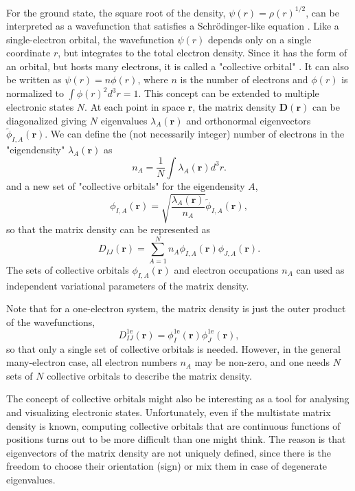 \documentclass[12pt]{article}
\newcommand\m[1]{\mathbf{#1}}
\renewcommand\vec[1]{\mathbf{#1}}
\begin{document}
For the ground state, the square root of the density, $\psi(r) = \rho(r)^{1/2}$, can be interpreted
as a wavefunction that satisfies a Schr\"{o}dinger-like equation \cite{Levy1988exact}.
Like a single-electron orbital, the wavefunction $\psi(r)$ depends only on a single coordinate $r$,
but integrates to the total electron density. Since it has the form of an orbital, but hosts
many electrons, it is called a "collective orbital" \cite{Mi2023orbital}.
It can also be written as $\psi(r) = n \phi(r)$, where $n$ is the number of electrons
and $\phi(r)$ is normalized to $\int \phi(r)^2 d^3\!r = 1$.
This concept can be extended to multiple electronic states $N$. At each point in space $\vec{r}$, the matrix density $\m{D}(\vec{r})$ can be diagonalized giving $N$ eigenvalues $\lambda_{A}(\vec{r})$ and orthonormal eigenvectors $\tilde{\phi}_{I,A}(\vec{r})$.
We can define the (not necessarily integer) number of electrons in the "eigendensity" $\lambda_A(\vec{r})$ as
\begin{equation}
n_A = \frac{1}{N} \int \lambda_A(\vec{r}) d^3\!r.
\end{equation}
and a new set of "collective orbitals" for the eigendensity $A$,
\begin{equation}
\phi_{I,A}(\vec{r}) = \sqrt{\frac{\lambda_A(\vec{r})}{n_A}} \tilde{\phi}_{I,A}(\vec{r}),
\end{equation}
so that the matrix density can be represented as
\begin{equation}
D_{IJ}(\vec{r}) = \sum_{A=1}^{N} n_A \phi_{I,A}(\vec{r}) \phi_{J,A}(\vec{r}).
\end{equation}
The sets of collective orbitals $\phi_{I,A}(\vec{r})$ and electron occupations $n_A$ can used as independent
variational parameters of the matrix density.

Note that for a one-electron system, the matrix density is just the outer product of the wavefunctions,
\begin{equation}
D^{\text{1e}}_{IJ}(\vec{r}) = \phi^{\text{1e}}_{I}(\vec{r}) \phi^{\text{1e}}_{J}(\vec{r}),
\end{equation}
so that only a single set of collective orbitals is needed.
However, in the general many-electron case, all electron numbers $n_A$ may be non-zero,
and one needs $N$ sets of $N$ collective orbitals to describe the matrix density.

The concept of collective orbitals might also be interesting as a tool for analysing and visualizing electronic states.
Unfortunately, even if the multistate matrix density is known, computing collective orbitals that are continuous functions of positions
turns out to be more difficult than one might think. The reason is that eigenvectors of the matrix density are not uniquely defined,
since there is the freedom to choose their orientation (sign) or mix them in case of degenerate eigenvalues.
\end{document}

